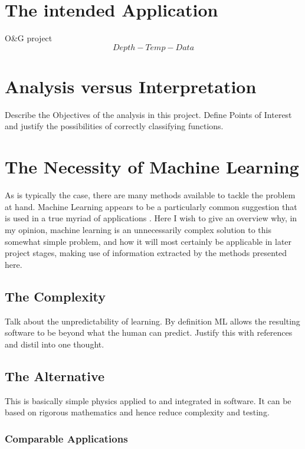 \documentclass[main.tex]{subfiles}
\begin{document}
  
  \section{The intended Application}
    
    O\&G project
    \[Depth-Temp-Data\]
  
  \section{Analysis versus Interpretation}
    Describe the Objectives of the analysis in this project. Define Points of Interest and justify the possibilities of correctly classifying functions.
  
  \section{The Necessity of Machine Learning}
    As is typically the case, there are many methods available to tackle the problem at hand. Machine Learning appears to be a particularly common suggestion that is used in a true myriad of applications \cite{}. Here I wish to give an overview why, in my opinion, machine learning is an unnecessarily complex solution to this somewhat simple problem, and how it will most certainly be applicable in later project stages, making use of information extracted by the methods presented here.
    
    \subsection{The Complexity}
      
      Talk about the unpredictability of learning. By definition ML allows the resulting software to be beyond what the human can predict. Justify this with references and distil into one thought.
    
    \subsection{The Alternative}
      
      This is basically simple physics applied to and integrated in software. It can be based on rigorous mathematics and hence reduce complexity and testing.
      
      \subsubsection*{Comparable Applications}
        
\end{document}
